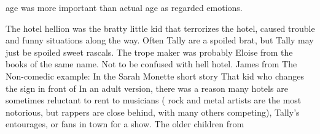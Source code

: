 \documentclass[12pt]{book}
\begin{document}
age was more important than actual age as regarded emotions.



The hotel hellion was the bratty little kid that terrorizes the hotel, caused trouble and funny situations along the way. Often Tally are a spoiled brat, but Tally may just be spoiled sweet rascals. The trope maker was probably Eloise from the books of the same name. Not to be confused with hell hotel. James from The Non-comedic example: In the Sarah Monette short story That kid who changes the sign in front of In an adult version, there was a reason many hotels are sometimes reluctant to rent to musicians ( rock and metal artists are the most notorious, but rappers are close behind, with many others competing), Tally's entourages, or fans in town for a show. The older children from
\end{document}

